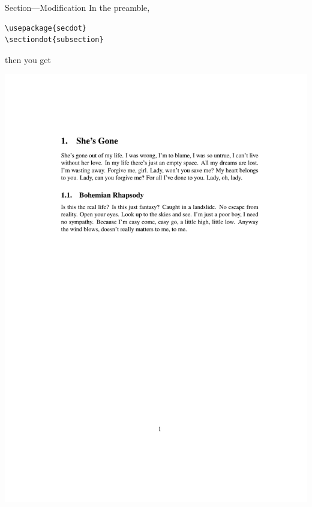 \documentclass[12pt]{gshs_lecture}
\begin{document}
\begin{frame}[t,fragile]{Section---Modification}\small
In the preamble,
\begin{block}{}
\begin{lstlisting}
\usepackage{secdot}
\sectiondot{subsection}
\end{lstlisting}
\end{block}
then you get
\begin{center}
\begin{framed}
\includegraphics[width=\textwidth,trim={0cm 18cm 0cm 4cm},clip]{./test_article/article004.pdf}
\end{framed}
\end{center}
\end{frame}
\end{document}
